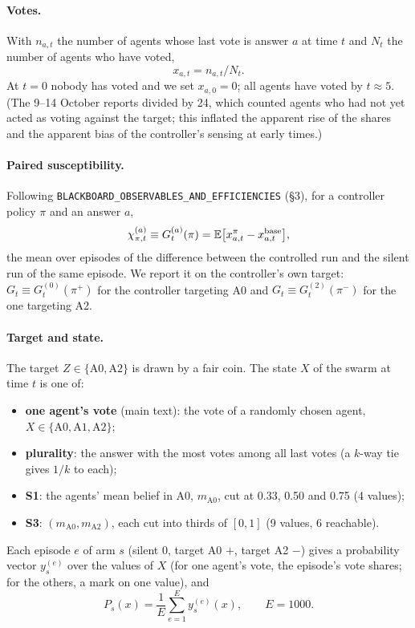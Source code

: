 \documentclass[10pt,a4paper]{article}
\begin{document}
\paragraph{Votes.} With $n_{a,t}$ the number of agents whose last vote is answer $a$ at time $t$ and $N_t$ the
number of agents who have voted,
\begin{equation}\label{eq:share}
x_{a,t} = n_{a,t}/N_t .
\end{equation}
At $t = 0$ nobody has voted and we set $x_{a,0} = 0$; all agents have voted by $t \approx 5$. (The 9--14 October reports divided by 24, which counted agents who had
not yet acted as voting against the target; this inflated the apparent rise of the shares and the apparent bias of
the controller's sensing at early times.)

\paragraph{Paired susceptibility.} Following \texttt{BLACKBOARD\_OBSERVABLES\_AND\_EFFICIENCIES} (\S3), for a
controller policy $\pi$ and an answer $a$,
\begin{equation}\label{eq:chi}
\chi^{(a)}_{\pi,t} \equiv G^{(a)}_t(\pi) = \mathbb E\bigl[x^{\pi}_{a,t} - x^{\rm base}_{a,t}\bigr],
\end{equation}
the mean over episodes of the difference between the controlled run and the silent run of the same episode. We
report it on the controller's own target: $G_t \equiv G^{(0)}_t(\pi^{+})$ for the controller targeting A0 and
$G_t \equiv G^{(2)}_t(\pi^{-})$ for the one targeting A2.

\paragraph{Target and state.} The target $Z \in \{\text{A0}, \text{A2}\}$ is drawn by a fair coin. The state $X$
of the swarm at time $t$ is one of:
\begin{itemize}\itemsep1pt
\item \textbf{one agent's vote} (main text): the vote of a randomly chosen agent, $X \in \{\text{A0},\text{A1},\text{A2}\}$;
\item \textbf{plurality}: the answer with the most votes among all last votes (a $k$-way tie gives $1/k$ to each);
\item \textbf{S1}: the agents' mean belief in A0, $m_{\text{A0}}$, cut at 0.33, 0.50 and 0.75 (4 values);
\item \textbf{S3}: $(m_{\text{A0}}, m_{\text{A2}})$, each cut into thirds of $[0, 1]$ (9 values, 6 reachable).
\end{itemize}
Each episode $e$ of arm $s$ (silent 0, target A0 $+$, target A2 $-$) gives a probability vector $y^{(e)}_s$ over
the values of $X$ (for one agent's vote, the episode's vote shares; for the others, a mark on one value), and
\begin{equation}\label{eq:P}
P_s(x) = \frac1E\sum_{e=1}^{E} y^{(e)}_s(x), \qquad E = 1000 .
\end{equation}
\end{document}
